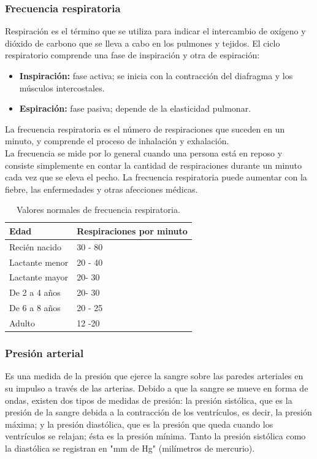 	\subsubsection{Frecuencia respiratoria}
	Respiración es el término que se utiliza para indicar el intercambio de oxígeno y dióxido de carbono que se lleva a cabo en los pulmones y tejidos. El ciclo respiratorio comprende una fase de inspiración y otra de espiración:
	\begin{itemize}
		\item \textbf{Inspiración:} fase activa; se inicia con la contracción del diafragma y los músculos intercostales.
		\item \textbf{Espiración:} fase pasiva; depende de la elasticidad pulmonar.
	\end{itemize}
	
	La frecuencia respiratoria es el número de respiraciones que suceden en un minuto, y comprende el proceso de inhalación y exhalación.\\
	
	La frecuencia se mide por lo general cuando una persona está en reposo y consiste simplemente en contar la cantidad de respiraciones durante un minuto cada vez que se eleva el pecho. La frecuencia respiratoria puede aumentar con la fiebre, las enfermedades y otras afecciones médicas.
	
	\begin{table}[htbp]
		\begin{center}
			\begin{tabular}{|l|l|}
				\hline
				\textbf{Edad} & \textbf{Respiraciones por minuto} \\
				\hline \hline
				Recién nacido & 30 - 80  \\
				\hline
				Lactante menor & 20 - 40  \\
				\hline
				Lactante mayor & 20- 30  \\
				\hline
				De 2 a 4 años & 20- 30  \\
				\hline
				De 6 a 8 años & 20 - 25  \\
				\hline
				Adulto & 12 -20  \\
				\hline
			\end{tabular}
			\caption{Valores normales de frecuencia respiratoria.}
		\end{center}
	\end{table}
	
	\subsubsection{Presión arterial}
	Es una medida de la presión que ejerce la sangre sobre las paredes arteriales en su impulso a través de las arterias. Debido a que la sangre se mueve en forma de ondas, existen dos tipos de medidas de presión: la presión sistólica, que es la presión de la sangre debida a la contracción de los ventrículos, es decir, la presión máxima; y la presión diastólica, que es la presión que queda cuando los ventrículos se relajan; ésta es la presión mínima. Tanto la presión sistólica como la diastólica se registran en "mm de Hg" (milímetros de mercurio). \\
	

